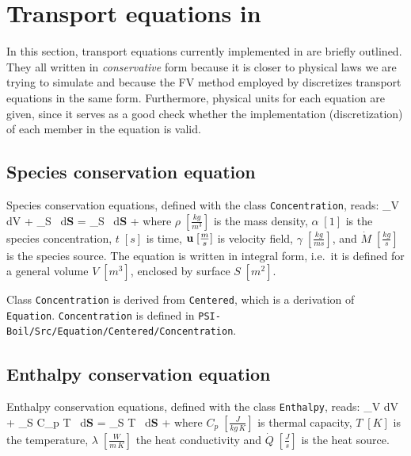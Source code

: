 \section{Transport equations in {\psiboil}}
\label{sec_equations}

In this section, transport equations currently implemented in {\psiboil} 
are briefly outlined. They all written in {\em conservative} form
because it is closer to physical laws we are trying to simulate and 
because the FV method employed by {\psiboil} discretizes transport
equations in the same form. Furthermore, physical units for
each equation are given, since it serves as a good check whether the
implementation (discretization) of each member in the equation is 
valid. 

\subsection{Species conservation equation}

Species conservation equations, defined with the class {\tt Concentration}, reads:
%
\be
         \int_V  dV
       + \int_S \rho \uvw \alpha \, d{\bf S}
       = \int_S \gamma \nabla \alpha \, d{\bf S}
       + 
       \; \; \; \;
       [\frac{kg}{s}]
  \label{eq_species}
\ee
%
where $\rho \; [\frac{kg}{m^3}]$ is the mass density, $\alpha \; [1]$ is the
species concentration, $t \; [s]$ is time, ${\bf u} \; [\frac{m}{s}]$ is velocity 
field, $\gamma \; [\frac{kg}{ms}]$, and $\dot{M} \; [\frac{kg}{s}]$ is the 
species source. The equation is written in integral form, i.e.\ it is defined
for a general volume $V \; [m^3]$, enclosed by surface $S \; [m^2]$.

Class {\tt Concentration} is derived from {\tt Centered}, which is a derivation
of {\tt Equation}. {\tt Concentration} is defined in 
{\tt PSI-Boil/Src/Equation/Centered/Concentration}.

\subsection{Enthalpy conservation equation}

Enthalpy conservation equations, defined with the class {\tt Enthalpy}, reads:
%
\be
         \int_V  dV
       + \int_S \rho C_p \uvw T \, d{\bf S}
       = \int_S \lambda \nabla T \, d{\bf S}
       + 
       \; \; \; \;
       [\frac{J}{s} = W]
  \label{eq_enthalpy}
\ee
%
where $C_p \; [\frac{J}{kg \, K}]$ is thermal capacity, $T \; [K]$ is the 
temperature, $\lambda \; [\frac{W}{m \, K}]$ the heat conductivity and 
$\dot{Q} \; [\frac{J}{s}]$ is the heat source.

